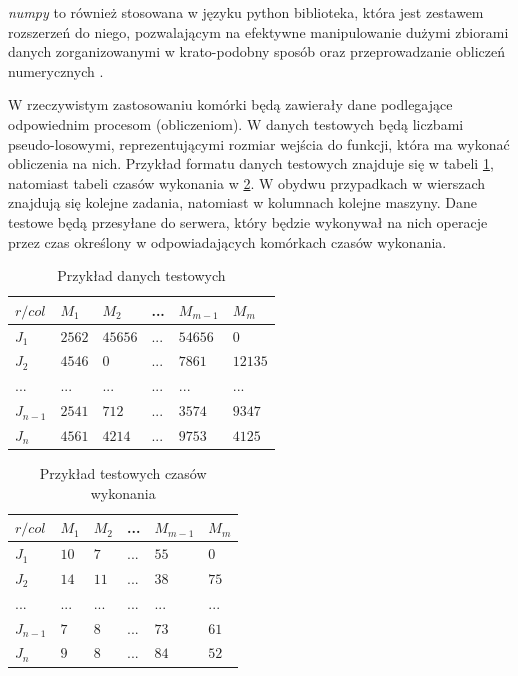 \documentclass[brudnopis]{xmgr}
\begin{document}
\emph{numpy} to również stosowana w języku python biblioteka, która jest zestawem rozszerzeń do niego, pozwalającym na efektywne manipulowanie dużymi zbiorami danych zorganizowanymi w krato-podobny sposób oraz przeprowadzanie obliczeń numerycznych \cite{NUMPY1:2020:X} \cite{NUMPY2:1999:X}.
\medskip

W rzeczywistym zastosowaniu komórki będą zawierały dane podlegające odpowiednim procesom (obliczeniom).
W danych testowych będą liczbami pseudo-losowymi, reprezentującymi rozmiar wejścia do funkcji, która ma wykonać obliczenia na nich.
Przykład formatu danych testowych znajduje się w tabeli \ref{tab:example-test_data}, natomiast tabeli czasów wykonania w \ref{tab:example-test_times}. W obydwu przypadkach w wierszach znajdują się kolejne zadania, natomiast w kolumnach kolejne maszyny. Dane testowe będą przesyłane do serwera, który będzie wykonywał na nich operacje przez czas określony w odpowiadających komórkach czasów wykonania.
\medskip

\begin{table}[!tbh]
\begin{tabular}{|l|l|l|l|l|l|} \hline
$r / col$   & $M_1$     & $M_2$     & ...   & $M_{m-1}$ & $M_{m}$   \\ \hline
$J_1$       & $2562$    & $45656$   & ...   & $54656$   & $0$       \\ \hline
$J_2$       & $4546$    & $0$       & ...   & $7861$    & $12135$   \\ \hline
$...$       & $...$     & $...$     & $...$ & $...$     & $...$     \\ \hline
$J_{n-1}$   & $2541$    & $712$     & ...   & $3574$    & $9347$    \\ \hline
$J_{n}$     & $4561$    & $4214$    & ...   & $9753$    & $4125$    \\ \hline
\end{tabular}
\caption{Przykład danych testowych\label{tab:example-test_data}}
\end{table}

\begin{table}[!tbh]
\begin{tabular}{|l|l|l|l|l|l|} \hline
$r / col$   & $M_1$     & $M_2$     & ...   & $M_{m-1}$ & $M_{m}$   \\ \hline
$J_1$       & $10$      & $7$       & ...   & $55$      & $0$       \\ \hline
$J_2$       & $14$      & $11$      & ...   & $38$      & $75$      \\ \hline
$...$       & $...$     & $...$     & $...$ & $...$     & $...$     \\ \hline
$J_{n-1}$   & $7$       & $8$       & ...   & $73$      & $61$      \\ \hline
$J_{n}$     & $9$       & $8$       & ...   & $84$      & $52$      \\ \hline
\end{tabular}
\caption{Przykład testowych czasów wykonania\label{tab:example-test_times}}
\end{table}
\end{document}
